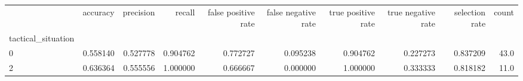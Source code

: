 \begin{tabular}{lrrrrrrrrr}
\toprule
{} &  accuracy &  precision &    recall &  false positive rate &  false negative rate &  true positive rate &  true negative rate &  selection rate &  count \\
tactical\_situation &           &            &           &                      &                      &                     &                     &                 &        \\
\midrule
0                  &  0.558140 &   0.527778 &  0.904762 &             0.772727 &             0.095238 &            0.904762 &            0.227273 &        0.837209 &   43.0 \\
2                  &  0.636364 &   0.555556 &  1.000000 &             0.666667 &             0.000000 &            1.000000 &            0.333333 &        0.818182 &   11.0 \\
\bottomrule
\end{tabular}
